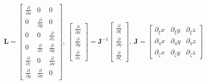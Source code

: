 \documentclass[a4paper,12pt]{article}
\begin{document}
\begin{eqnarray}
\textbf{L}=\left [
\begin{array}{ccc}
\frac{\partial }{\partial x} & 0 & 0\\
0 & \frac{\partial }{\partial y} & 0\\
0 & 0 & \frac{\partial }{\partial z}\\
0 & \frac{\partial }{\partial z} & \frac{\partial }{\partial y}\\
\frac{\partial }{\partial z} & 0 & \frac{\partial }{\partial x}\\
\frac{\partial }{\partial y} & \frac{\partial }{\partial x} & 0
\end{array} \right],\ 
\left [
\begin{array}{c}
\frac{\partial }{\partial x}\\
\frac{\partial }{\partial y}\\
\frac{\partial }{\partial z}
\end{array} \right] =\textbf{J}^{-1}
\left [
\begin{array}{c}
\frac{\partial }{\partial \xi}\\
\frac{\partial }{\partial \eta}\\
\frac{\partial }{\partial \zeta}
\end{array} \right], \ 
\textbf{J}=\left [
\begin{array}{ccc}
\partial_\xi x & {\partial_\xi y} & {\partial_\xi z}\\
\partial_\eta x & {\partial_\eta y} & {\partial_\eta z}\\
\partial_\zeta x & {\partial_\zeta y} & {\partial_\zeta z}
\end{array} \right]
\end{eqnarray}
\end{document}
